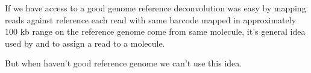 \documentclass[main.tex]{subfiles}
\begin{document}
If we have access to a good genome reference deconvolution was easy by mapping reads against reference each read with same barcode mapped in approximately 100 kb range on the reference genome come from same molecule, it's general idea used by \cite{ema} and \cite{lariat} to assign a read to a molecule.

But when haven't good reference genome we can't use this idea. 


\end{document}
